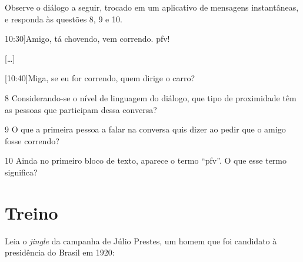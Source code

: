 
Observe o diálogo a seguir, trocado em um aplicativo de mensagens
instantâneas, e responda às questões 8, 9 e 10.

\begin{myquote}
\hspace\parindent {[}10:30{]}\quad Amigo, tá chovendo, vem correndo. pfv!

{[}\ldots{]}

{[}10:40{]}\quad Miga, se eu for correndo, quem dirige o carro?
\end{myquote}

\num{8} Considerando-se o nível de linguagem do diálogo, que tipo de
proximidade têm as pessoas que participam dessa conversa?


\num{9} O que a primeira pessoa a falar na conversa quis dizer ao pedir
que o amigo fosse correndo?


\num{10} Ainda no primeiro bloco de texto, aparece o termo ``pfv''. O
que esse termo significa?


\section*{Treino}

Leia o \emph{jingle} da campanha de Júlio Prestes, um homem que
foi candidato à presidência do Brasil em 1920:

